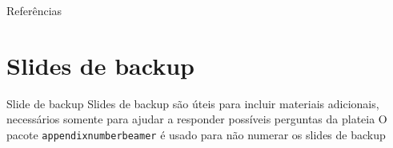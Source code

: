 \documentclass{beamer}
\begin{document}
\begin{frame}{Referências}
    \nocite{*}
    
    
\end{frame}

\appendix

\section{Slides de backup}

\begin{frame}{Slide de backup}
    Slides de backup são úteis para incluir materiais adicionais, necessários somente para ajudar a responder possíveis perguntas da plateia
    \vfill
    O pacote \texttt{appendixnumberbeamer} é usado para não numerar os slides de backup
\end{frame}
\end{document}
